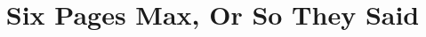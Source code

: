 \documentclass[conference]{IEEEtran}
\begin{document}
\title{Six Pages Max, Or So They Said}

%


\maketitle










\printbibliography

\balance
\end{document}
